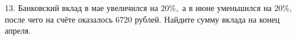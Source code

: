 13. Банковский вклад в мае увеличился на $20\%,$ а в июне уменьшился на $20\%,$ после чего на счёте оказалось 6720 рублей. Найдите сумму вклада на конец апреля.\\

